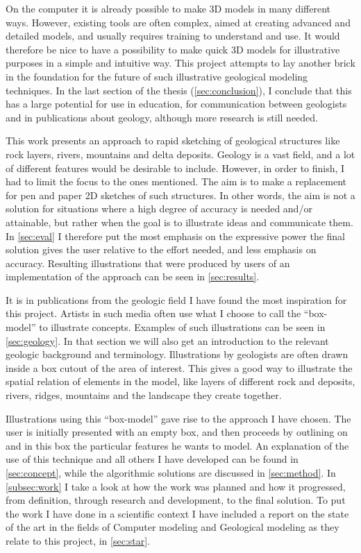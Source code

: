 \documentclass[a4paper,12pt]{report}
\newcommand{\secref}[1]{\autoref{#1}}
\begin{document}
On the computer it is already possible to make 3D models in many different ways. However, existing tools are often complex, aimed at creating advanced and detailed models, and usually requires training to understand and use. It would therefore be nice to have a possibility to make quick 3D models for illustrative purposes in a simple and intuitive way. This project attempts to lay another brick in the foundation for the future of such illustrative geological modeling techniques. In the last section of the thesis (\secref{sec:conclusion}), I conclude that this has a large potential for use in education, for communication between geologists and in publications about geology, although more research is still needed.

This work presents an approach to rapid sketching of geological structures like rock layers, rivers, mountains and delta deposits. Geology is a vast field, and a lot of different features would be desirable to include. However, in order to finish, I had to limit the focus to the ones mentioned. The aim is to make a replacement for pen and paper 2D sketches of such structures. In other words, the aim is not a solution for situations where a high degree of accuracy is needed and/or attainable, but rather when the goal is to illustrate ideas and communicate them. In \secref{sec:eval} I therefore put the most emphasis on the expressive power the final solution gives the user relative to the effort needed, and less emphasis on accuracy. Resulting illustrations that were produced by users of an implementation of the approach can be seen in \secref{sec:results}.

It is in publications from the geologic field I have found the most inspiration for this project. Artists in such media often use what I choose to call the ``box-model'' to illustrate concepts. Examples of such illustrations can be seen in \secref{sec:geology}. In that section we will also get an introduction to the relevant geologic background and terminology. Illustrations by geologists are often drawn inside a box cutout of the area of interest. This gives a good way to illustrate the spatial relation of elements in the model, like layers of different rock and deposits, rivers, ridges, mountains and the landscape they create together.

Illustrations using this ``box-model'' gave rise to the approach I have chosen. The user is initially presented with an empty box, and then proceeds by outlining on and in this box the particular features he wants to model. An explanation of the use of this technique and all others I have developed can be found in \secref{sec:concept}, while the algorithmic solutions are discussed in \secref{sec:method}. In \secref{subsec:work} I take a look at how the work was planned and how it progressed, from definition, through research and development, to the final solution. To put the work I have done in a scientific context I have included a report on the state of the art in the fields of Computer modeling and Geological modeling as they relate to this project, in \secref{sec:star}.
\clearpage
\end{document}
